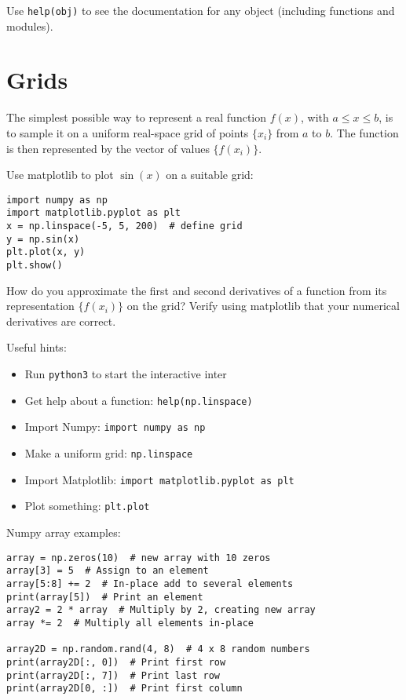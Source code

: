 \documentclass{article}
\newcommand{\exercise}[1]{
  \bigskip
  \begin{boxedminipage}[c]{0.8\linewidth}
  #1
  \end{boxedminipage}
  \bigskip
}
\begin{document}
Use \lstinline{help(obj)} to see the documentation for any object
(including functions and modules).

\section{Grids}
The simplest possible way to represent a real function $f(x)$,
with $a \le x \le b$, is to
sample it on a uniform real-space grid of points $\{x_i\}$ from $a$ to $b$.
The function is then represented by the vector of values $\{f(x_i)\}$.

Use matplotlib to plot $\sin(x)$ on a suitable grid:

\begin{lstlisting}
import numpy as np
import matplotlib.pyplot as plt
x = np.linspace(-5, 5, 200)  # define grid
y = np.sin(x)
plt.plot(x, y)
plt.show()
\end{lstlisting}

\exercise{
How do you approximate the first and second derivatives of a function from
its representation $\{f(x_i)\}$ on the grid?  Verify using matplotlib that your
numerical derivatives are correct.
}

Useful hints:

\begin{itemize}
\item Run \texttt{python3} to start the interactive inter
\item Get help about a function: \texttt{help(np.linspace)}
\item Import Numpy: \texttt{import numpy as np}
\item Make a uniform grid: \texttt{np.linspace}
\item Import Matplotlib: \texttt{import matplotlib.pyplot as plt}
\item Plot something: \texttt{plt.plot}
\end{itemize}

Numpy array examples:
\begin{lstlisting}
array = np.zeros(10)  # new array with 10 zeros
array[3] = 5  # Assign to an element
array[5:8] += 2  # In-place add to several elements
print(array[5])  # Print an element
array2 = 2 * array  # Multiply by 2, creating new array
array *= 2  # Multiply all elements in-place

array2D = np.random.rand(4, 8)  # 4 x 8 random numbers
print(array2D[:, 0])  # Print first row
print(array2D[:, 7])  # Print last row
print(array2D[0, :])  # Print first column
\end{lstlisting}
\end{document}
